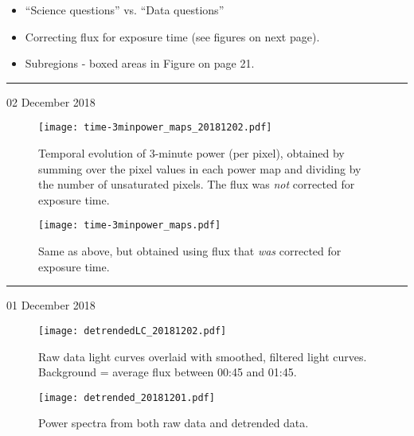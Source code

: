 \documentclass[]{article}
\newcommand{\mydate}[1]{\hrule\vspace{-1mm}\hfill{\small\color{blue}#1}}
\begin{document}
\begin{itemize}
    \item ``Science questions'' vs. ``Data questions''
    \item Correcting flux for exposure time (see figures on next page).
    \item Subregions - boxed areas in Figure on page 21.
\end{itemize}

\clearpage

\mydate{02 December 2018}

\vspace{1in}

\begin{figure}[htb!]
    \texttt{[image: time-3minpower\_maps\_20181202.pdf]}
    \caption*{
        Temporal evolution of 3-minute power (per pixel),
        obtained by summing over the pixel values in each power map
        and dividing by the number of unsaturated pixels.
        The flux was \emph{not} corrected for exposure time.
    }
\end{figure}

\begin{figure}[htb!]
    \texttt{[image: time-3minpower\_maps.pdf]}
    \caption*{
        Same as above, but obtained using flux that \emph{was} corrected
        for exposure time.
    }
\end{figure}




\clearpage


\mydate{01 December 2018}

\vspace{1in}

\begin{figure}[htb!]
    \texttt{[image: detrendedLC\_20181202.pdf]}
    \caption*{
        Raw data light curves overlaid with smoothed, filtered light curves.
        Background = average flux between 00:45 and 01:45.}
\end{figure}

\begin{figure}[htb!]
    \texttt{[image: detrended\_20181201.pdf]}
    \caption*{
        Power spectra from both raw data and detrended data.}
\end{figure}
\end{document}
